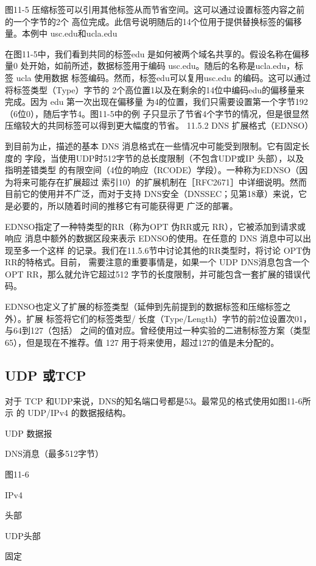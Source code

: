 图11-5 压缩标签可以引用其他标签从而节省空间。这可以通过设置标签内容之前的一个字节的2个
高位完成。此信号说明随后的14个位用于提供替换标签的偏移量。本例中 usc.edu和ucla.edu

在图11-5中，我们看到共同的标签edu 是如何被两个域名共享的。假设名称在偏移量0
处开始，如前所述，数据标签用于编码 usc.edu。随后的名称是ucla.edu，标签 ucla 使用数据
标签编码。然而，标签edu可以复用usc.edu 的编码。这可以通过将标签类型（Type）字节的
2个高位置1以及在剩余的14位中编码edu的偏移量来完成。因为 edu 第一次出现在偏移量
为4的位置，我们只需要设置第一个字节192（6位0），随后字节4。图11-5中的例
子只显示了节省4个字节的情况，但是很显然压缩较大的共同标签可以得到更大幅度的节省。
11.5.2 DNS 扩展格式（EDNSO）

到目前为止，描述的基本 DNS 消息格式在一些情况中可能受到限制。它有固定长度的
字段，当使用UDP时512字节的总长度限制（不包含UDP或IP 头部），以及指明差错类型
的有限空间（4位的响应（RCODE）学段）。一种称为EDNSO（因为将来可能存在扩展超过
索引10）的扩展机制在［RFC2671］中详细说明。然而目前它的使用并不广泛，而对于支持
DNS安全（DNSSEC；见第18章）来说，它是必要的，所以随着时间的推移它有可能获得更
广泛的部署。

EDNSO指定了一种特类型的RR（称为OPT 伪RR或元 RR），它被添加到请求或响应
消息中额外的数据区段来表示 EDNSO的使用。在任意的 DNS 消息中可以出现至多一个这样
的记录。我们在11.5.6节中讨论其他的RR类型时，将讨论 OPT伪 RR的特格式。目前，
需要注意的重要事情是，如果一个 UDP DNS消息包含一个 OPT RR，那么就允许它超过512
字节的长度限制，并可能包含一套扩展的错误代码。

EDNSO也定义了扩展的标签类型（延伸到先前提到的数据标签和压缩标签之外）。扩展
标签将它们的标签类型/ 长度（Type/Length）字节的前2位设置次01，与64到127（包括）
之间的值对应。曾经使用过一种实验的二进制标签方案（类型65），但是现在不推荐。值
127 用于将来使用，超过127的值是未分配的。

\subsection{UDP 或TCP}

对于 TCP 和UDP来说，DNS的知名端口号都是53。最常见的格式使用如图11-6所示
的 UDP/IPv4 的数据报结构。

UDP 数据报

DNS消息（最多512字节）

图11-6

IPv4

头部

UDP头部

固定

